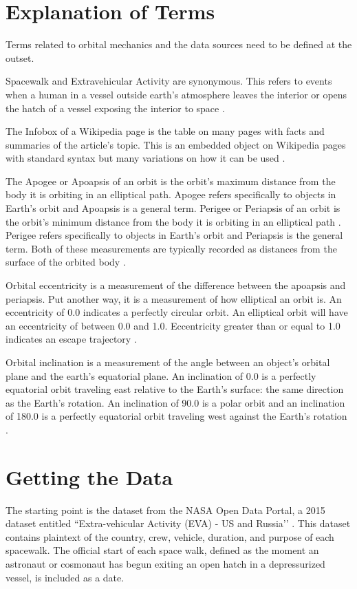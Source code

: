 \documentclass[sigconf]{acmart}
\begin{document}
\section{Explanation of Terms}
Terms related to orbital mechanics and the data sources need to be defined at the outset.

Spacewalk and Extravehicular Activity are synonymous. This refers to events when a human in a vessel outside earth's atmosphere leaves the interior or opens the hatch of a vessel exposing the interior to space \cite{Aeronautics1995}. 

The Infobox of a Wikipedia page is the table on many pages with facts and summaries of the article's topic. This is an embedded object on Wikipedia pages with standard syntax but many variations on how it can be used \cite{Wikipedia17}.

The Apogee or Apoapsis of an orbit is the orbit's maximum distance from the body it is orbiting in an elliptical path. Apogee refers specifically to objects in Earth's orbit and Apoapsis is a general term. Perigee or Periapsis of an orbit is the orbit's minimum distance from the body it is orbiting in an elliptical path \cite{Wolfson2007}. Perigee refers specifically to objects in Earth's orbit and Periapsis is the general term. Both of these measurements are typically recorded as distances from the surface of the orbited body \cite{Muirden1982}.

Orbital eccentricity is a measurement of the difference between the apoapsis and periapsis. Put another way, it is a measurement of how elliptical an orbit is. An eccentricity of 0.0 indicates a perfectly circular orbit. An elliptical orbit will have an eccentricity of between 0.0 and 1.0. Eccentricity greater than or equal to 1.0 indicates an escape trajectory \cite{Muirden1982}. 

Orbital inclination is a measurement of the angle between an object's orbital plane and the earth's equatorial plane. An inclination of 0.0 is a perfectly equatorial orbit traveling east relative to the Earth's surface: the same direction as the Earth's rotation. An inclination of 90.0 is a polar orbit and an inclination of 180.0 is a perfectly equatorial orbit traveling west against the Earth's rotation \cite{Muirden1982}. 



\section{Getting the Data}
The starting point is the dataset from the NASA Open Data Portal, a 2015 dataset entitled ``Extra-vehicular Activity (EVA) - US and Russia’’ \cite{NASA2014}.  This dataset contains plaintext of the country, crew, vehicle, duration, and purpose of each spacewalk. The official start of each space walk, defined as the moment an astronaut or cosmonaut has begun exiting an open hatch in a depressurized vessel, is included as a date.
\end{document}
